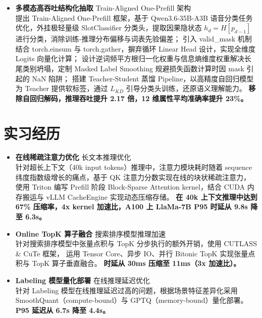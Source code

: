 \documentclass{resume}
\begin{document}
\begin{itemize}[parsep=0.2ex]
  \item \textbf{多模态高吞吐结构化抽取} \textbar{} Train-Aligned One-Prefill 架构 \\
  提出 Train-Aligned One-Prefill 框架，基于 Qwen3.6-35B-A3B 语音分类任务优化，外挂极轻量级 SlotClassifier 分类头，提取因果隐状态 $h_d = H[p_{d-1}]$ 进行分类，消除训练-推理分布偏移与词表先验偏差；
  引入 valid\_mask 机制结合 torch.einsum 与 torch.gather，摒弃循环 Linear Head 设计，实现全维度 Logits 向量化计算；
  设计逆词频平方根归一化权重与信息熵维度权重解决长尾类别坍塌，定制 Masked Label Smoothing 规避损失函数计算时因 mask 引起的 NaN 陷阱；
  搭建 Teacher-Student 蒸馏 Pipeline，以高精度自回归模型为 Teacher 提供软标签，通过 $L_{KD}$ 引导分类头训练，还原语义理解能力。
  \textbf{移除自回归解码，推理吞吐提升 2.17 倍，12 维属性平均准确率提升 23\%。}

\end{itemize}

\section{实习经历}

\begin{itemize}[parsep=0.2ex]
  \item \textbf{在线稀疏注意力优化} \textbar{} 长文本推理优化 \\
  针对超长上下文（40k input tokens）推理中，注意力模块耗时随着 sequence 纬度指数级增长的痛点，基于 QK 注意力分数实现在线的块状稀疏注意力，
  使用 Triton 编写 Prefill 阶段 Block-Sparse Attention kernel，结合 CUDA 内存搬运与 vLLM CacheEngine 实现动态压缩存储。
  \textbf{在 40k 上下文推理中达到 67\% 压缩率，4x kernel 加速比，A100 上 LlaMa-7B P95 时延从 9.8s 降至 6.3s。}

  \item \textbf{Online TopK 算子融合} \textbar{} 搜索排序模型推理加速 \\
  针对搜索排序模型中张量点积与 TopK 分步执行的额外开销，使用 CUTLASS \& CuTe 框架，
  运用 Tensor Core、异步 IO、并行 Bitonic TopK 实现张量点积与 TopK 算子垂直融合。
  \textbf{时延从 30ms 压缩至 11ms（3x 加速比）。}

  \item \textbf{Labeling 模型量化部署} \textbar{} 在线推理延迟优化 \\
  针对 Labeling 模型在线推理延迟过高的问题，根据场景特征差异化采用 SmoothQuant（compute-bound）与 GPTQ（memory-bound）量化部署。
  \textbf{P95 延迟从 6.7s 降至 4.4s。}
\end{itemize}
\end{document}
